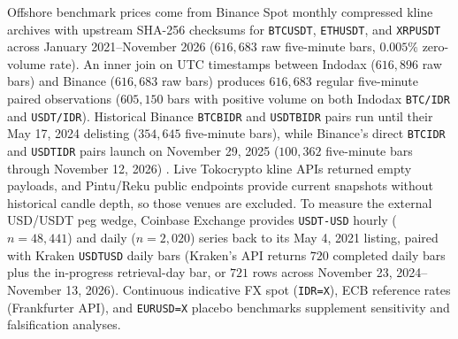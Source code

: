 Offshore benchmark prices come from Binance Spot monthly compressed kline archives with upstream SHA-256 checksums for \texttt{BTCUSDT}, \texttt{ETHUSDT}, and \texttt{XRPUSDT} across January 2021--November 2026 ($616,683$ raw five-minute bars, $0.005\%$ zero-volume rate). An inner join on UTC timestamps between Indodax ($616,896$ raw bars) and Binance ($616,683$ raw bars) produces $616,683$ regular five-minute paired observations ($605,150$ bars with positive volume on both Indodax \texttt{BTC/IDR} and \texttt{USDT/IDR}). Historical Binance \texttt{BTCBIDR} and \texttt{USDTBIDR} pairs run until their May 17, 2024 delisting ($354,645$ five-minute bars), while Binance's direct \texttt{BTCIDR} and \texttt{USDTIDR} pairs launch on November 29, 2025 ($100,362$ five-minute bars through November 12, 2026) \citep{binance_bidr_2024}. Live Tokocrypto kline APIs returned empty payloads, and Pintu/Reku public endpoints provide current snapshots without historical candle depth, so those venues are excluded. To measure the external USD/USDT peg wedge, Coinbase Exchange provides \texttt{USDT-USD} hourly ($n = 48,441$) and daily ($n = 2,020$) series back to its May 4, 2021 listing, paired with Kraken \texttt{USDTUSD} daily bars (Kraken's API returns $720$ completed daily bars plus the in-progress retrieval-day bar, or $721$ rows across November 23, 2024--November 13, 2026). Continuous indicative FX spot (\texttt{IDR=X}), ECB reference rates (Frankfurter API), and \texttt{EURUSD=X} placebo benchmarks supplement sensitivity and falsification analyses.



